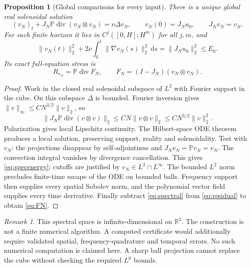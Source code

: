 \documentclass[11pt,a4paper]{article}
\newtheorem{proposition}[theorem]{Proposition}
\theoremstyle{definition}\newtheorem{definition}[theorem]{Definition}
\theoremstyle{remark}\newtheorem{remark}[theorem]{Remark}
\newcommand{\R}{\mathbb R}
\newcommand{\PP}{\mathbb P}
\newcommand{\dd}{\,\mathrm d}
\newcommand{\norm}[1]{\lVert #1\rVert}
\newcommand{\diver}{\operatorname{div}}
\numberwithin{equation}{section}
\begin{document}
\begin{proposition}[Global comparisons for every input]\label{prop:spectral}
There is a unique global real solenoidal solution
\begin{equation}\label{eq:spectral}
 (v_N)_t+J_N\PP\diver(v_N\otimes v_N)=\nu\Delta v_N,
 \qquad v_N(0)=J_Nu_0,\qquad J_Nv_N=v_N.
\end{equation}
For each finite horizon it lies in $C^j([0,H];H^m)$ for all $j,m$, and
\begin{equation}\label{eq:specenergy}
 \norm{v_N(t)}_2^2+2\nu\int_0^t\norm{\nabla v_N(s)}_2^2\dd s
 =\norm{J_Nu_0}_2^2\le E_0.
\end{equation}
Its exact full-equation stress is
\begin{equation}\label{eq:FN}
 R_{v_N}=\PP\diver F_N,\qquad F_N=(I-J_N)(v_N\otimes v_N).
\end{equation}
\end{proposition}
\begin{proof}
Work in the closed real solenoidal subspace of $L^2$ with Fourier support in the cube. On this subspace $\Delta$ is bounded. Fourier inversion gives $\norm v_\infty\le C N^{3/2}\norm v_2$, so
\[
 \norm{J_N\PP\diver(v\otimes v)}_2
 \le C N\norm{v\otimes v}_2\le C N^{5/2}\norm v_2^2.
\]
Polarization gives local Lipschitz continuity. The Hilbert-space ODE theorem produces a local solution, preserving support, reality and solenoidality. Test with $v_N$: the projections disappear by self-adjointness and $J_Nv_N=\PP v_N=v_N$. The convection integral vanishes by divergence cancellation. This gives \eqref{eq:specenergy}; cutoffs are justified by $v_N\in L^2\cap L^\infty$. The bounded $L^2$ norm precludes finite-time escape of the ODE on bounded balls. Frequency support then supplies every spatial Sobolev norm, and the polynomial vector field supplies every time derivative. Finally subtract \eqref{eq:spectral} from \eqref{eq:residual} to obtain \eqref{eq:FN}.
\end{proof}

\begin{remark}
This spectral space is infinite-dimensional on $\R^3$. The construction is not a finite numerical algorithm. A computed certificate would additionally require validated spatial, frequency-quadrature and temporal errors. No such numerical computation is claimed here. A sharp ball projection cannot replace the cube without checking the required $L^p$ bounds.
\end{remark}
\end{document}
